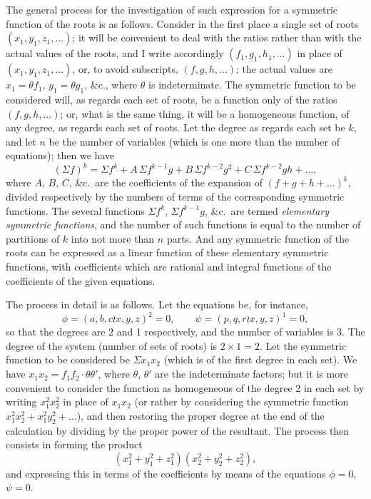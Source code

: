 \documentclass[11pt,a4paper]{book}
\begin{document}
\begin{center}
The general process for the investigation of such expression for a symmetric
function of the roots is as follows. Consider in the first place a single set
of roots $(x_1, y_1, z_1, \ldots)$; it will be convenient to deal with the
ratios rather than with the actual values of the roots, and I write accordingly
$(f_1, g_1, h_1, \ldots)$ in place of $(x_1, y_1, z_1, \ldots)$, or, to
avoid subscripts, $(f, g, h, \ldots)$; the actual values are $x_1 = \theta f_1$,
$y_1 = \theta g_1$, \&c., where $\theta$ is indeterminate. The symmetric function
to be considered will, as regards each set of roots, be a function only of the
ratios $(f, g, h, \ldots)$; or, what is the same thing, it will be a
homogeneous function, of any degree, as regards each set of roots. Let the
degree as regards each set be $k$, and let $n$ be the number of variables
(which is one more than the number of equations); then we have
\[
(\Sigma f)^k = \Sigma f^k + A\, \Sigma f^{k-1}g + B\, \Sigma f^{k-2}g^2
+ C\, \Sigma f^{k-2}gh + \ldots,
\]
where $A$, $B$, $C$, \&c.\ are the coefficients of the expansion of
$(f + g + h + \ldots)^k$, divided respectively by the numbers of terms of the
corresponding symmetric functions. The several functions $\Sigma f^k$,
$\Sigma f^{k-1}g$, \&c.\ are termed \emph{elementary symmetric functions}, and
the number of such functions is equal to the number of partitions of $k$ into
not more than $n$ parts. And any symmetric function of the roots can be
expressed as a linear function of these elementary symmetric functions, with
coefficients which are rational and integral functions of the coefficients of
the given equations.

The process in detail is as follows. Let the equations be, for instance,
\[
\phi = (a, b, c \wr x, y, z)^2 = 0,
\qquad
\psi = (p, q, r \wr x, y, z)^1 = 0,
\]
so that the degrees are 2 and 1 respectively, and the number of variables is
3. The degree of the system (number of sets of roots) is $2 \times 1 = 2$.
Let the symmetric function to be considered be $\Sigma x_1 x_2$ (which is of
the first degree in each set). We have $x_1 x_2 = f_1 f_2 \cdot \theta\theta'$,
where $\theta$, $\theta'$ are the indeterminate factors; but it is more
convenient to consider the function as homogeneous of the degree 2 in each set
by writing $x_1^2 x_2^2$ in place of $x_1 x_2$ (or rather by considering the
symmetric function $x_1^2 x_2^2 + x_1^2 y_2^2 + \ldots$), and then restoring
the proper degree at the end of the calculation by dividing by the proper
power of the resultant. The process then consists in forming the product
\[
(x_1^2 + y_1^2 + z_1^2)(x_2^2 + y_2^2 + z_2^2),
\]
and expressing this in terms of the coefficients by means of the equations
$\phi = 0$, $\psi = 0$.


\end{center}
\end{document}
